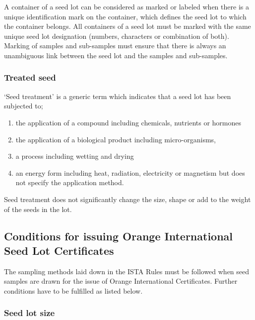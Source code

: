 \documentclass[
]{book}
\begin{document}
A container of a seed lot can be considered as marked or labeled when there is a unique identification mark on the container, which defines the seed lot to which the container belongs. All containers of a seed lot must be marked with the same unique seed lot designation (numbers, characters or combination of both). Marking of samples and sub-samples must ensure that there is always an unambiguous link between the seed lot and the samples and sub-samples.

\hypertarget{treated-seed}{%
\subsubsection{Treated seed}\label{treated-seed}}

`Seed treatment' is a generic term which indicates that a seed lot has been subjected to;

\begin{enumerate}
\def\labelenumi{\alph{enumi})}
\item
  the application of a compound including chemicals, nutrients or hormones
\item
  the application of a biological product including micro-organisms,
\item
  a process including wetting and drying
\item
  an energy form including heat, radiation, electricity or magnetism but does not specify the application method.
\end{enumerate}

Seed treatment does not significantly change the size, shape or add to the weight of the seeds in the lot.

\hypertarget{conditions-for-issuing-orange-international-seed-lot-certificates}{%
\subsection{Conditions for issuing Orange International Seed Lot Certificates}\label{conditions-for-issuing-orange-international-seed-lot-certificates}}

The sampling methods laid down in the ISTA Rules must be followed when seed samples are drawn for the issue of Orange International Certificates. Further conditions have to be fulfilled as listed below.

\hypertarget{seed-lot-size}{%
\subsubsection{Seed lot size}\label{seed-lot-size}}
\end{document}
